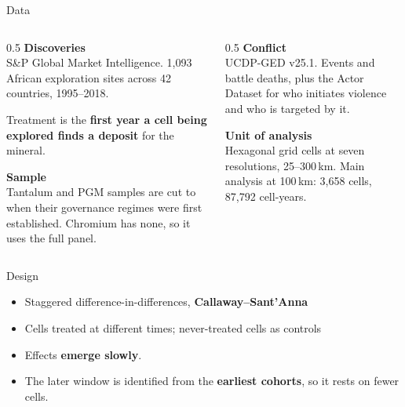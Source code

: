 \documentclass[aspectratio=169,11pt]{beamer}
\begin{document}
\begin{frame}{Data}
  \begin{columns}[T]
    \begin{column}{0.5\textwidth}
      \textbf{Discoveries} \\[0.3em]
      {\small S\&P Global Market Intelligence. 1{,}093 African exploration sites
      across 42 countries, 1995--2018.}
      \vspace{0.7em}

      {\small Treatment is the \textbf{first year a cell being explored finds a deposit} for the mineral.}
      \vspace{1.0em}

      \textbf{Sample} \\[0.3em]
      {\small Tantalum and PGM samples are cut to when their governance regimes
      were first established. Chromium has none, so it uses the full panel.}
    \end{column}
    \begin{column}{0.5\textwidth}
      \textbf{Conflict} \\[0.3em]
      {\small UCDP-GED v25.1. Events and battle deaths, plus the Actor Dataset
      for who initiates violence and who is targeted by it.}
      \vspace{1.0em}

      \textbf{Unit of analysis} \\[0.3em]
      {\small Hexagonal grid cells at seven resolutions, 25--300\,km.
      Main analysis at 100\,km: 3{,}658 cells, 87{,}792 cell-years.}
    \end{column}
  \end{columns}
\end{frame}

\begin{frame}{Design}
  \begin{itemize}
    \item Staggered difference-in-differences, \textbf{Callaway--Sant'Anna}
    \item Cells treated at different times; never-treated cells as controls
  \end{itemize}
  \vspace{0.8em}
  \begin{block}{}
    \begin{itemize}
      \item Effects \textbf{emerge slowly}.
      \item The later window is identified from the \textbf{earliest cohorts},
            so it rests on fewer cells.
    \end{itemize}
  \end{block}
  \vspace{0.4em}
\end{frame}
\end{document}

